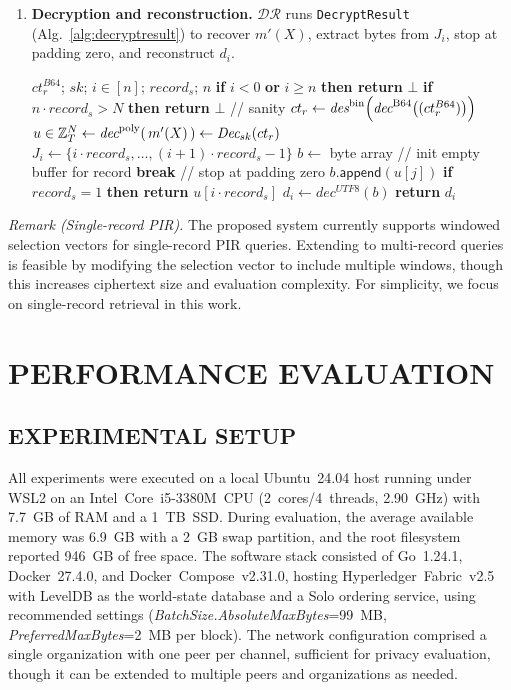 \documentclass[letterpaper,journal]{IEEEtran}
\newcommand{\decB}[1]{\emph{dec}^{\mathrm{B64}}\!\left(#1\right)}
\newcommand{\decP}[1]{\emph{dec}^{\mathrm{poly}}\!\left(#1\right)}
\newcommand{\des}[1]{\emph{des}^{\mathrm{bin}}\!\left(#1\right)}
\begin{document}
\begin{enumerate}
    \item \textbf{Decryption and reconstruction.}  
    $\mathcal{DR}$ runs \texttt{DecryptResult} (Alg.~\ref{alg:decryptresult}) to recover $m'(X)$, 
    extract bytes from $J_i$, stop at padding zero, and reconstruct $d_i$.

    \begin{algorithm}[!htbp]
      \caption{\texttt{DecryptResult} (client)}
      \label{alg:decryptresult}
      \begin{algorithmic}[1]
      \REQUIRE $ct_r^{B64}$; $sk$; $i\in[n]$; $record_s$; $n$
      \STATE \textbf{if } $i<0$ \textbf{ or } $i\ge n$ \textbf{ then return } $\bot$
      \STATE \textbf{if } $n\cdot record_s > N$ \textbf{ then return } $\bot$ \hfill // sanity
      \STATE $ct_r \leftarrow \des{\decB{(ct_r^{B64})}}$
      \STATE $u \in \mathbb{Z}_T^{N} \leftarrow \decP{\,m'(X)\,} \leftarrow \emph{Dec}_{sk}(ct_r)$
      \STATE $J_i \leftarrow \{i\cdot record_s,\dots,(i+1)\cdot record_s-1\}$
      \STATE $b \leftarrow$ byte array // init empty buffer for record
           \STATE \textbf{break} \ENDIF \hfill // stop at padding zero
          \STATE $b.\mathsf{append}(u[j])$ 
      \ENDFOR
      \STATE \textbf{if } {$record_s=1$} \textbf{ then return } $u[i\cdot record_s]$
      \STATE $d_i \leftarrow {dec^{UTF8}}(b)$ 
      \STATE \textbf{return } $d_i$
      \end{algorithmic}
  \end{algorithm}
\end{enumerate}

\noindent\textit{Remark (Single-record PIR).}
The proposed system currently supports windowed selection vectors for single-record PIR queries.
Extending to multi-record queries is feasible by modifying the selection vector
to include multiple windows, though this increases ciphertext size and evaluation complexity.
For simplicity, we focus on single-record retrieval in this work.

\section{PERFORMANCE EVALUATION}\label{sec:evaluation}
\subsection{EXPERIMENTAL SETUP}

All experiments were executed on a local Ubuntu~24.04 host running under WSL2 on an Intel~Core~i5-3380M~CPU 
(2~cores/4~threads, 2.90~GHz) with 7.7~GB of RAM and a 1~TB~SSD. 
During evaluation, the average available memory was 6.9~GB with a 2~GB swap partition, 
and the root filesystem reported 946~GB of free space.
The software stack consisted of Go~1.24.1, Docker~27.4.0, and Docker~Compose~v2.31.0, 
hosting Hyperledger~Fabric~v2.5 with LevelDB as the world-state database and a Solo ordering service, using recommended settings 
(\emph{BatchSize.AbsoluteMaxBytes}=99~MB, \emph{PreferredMaxBytes}=2~MB per block).
The network configuration comprised a single organization with one peer per channel, 
sufficient for privacy evaluation, though it can be extended to multiple peers and organizations as needed.
\end{document}

